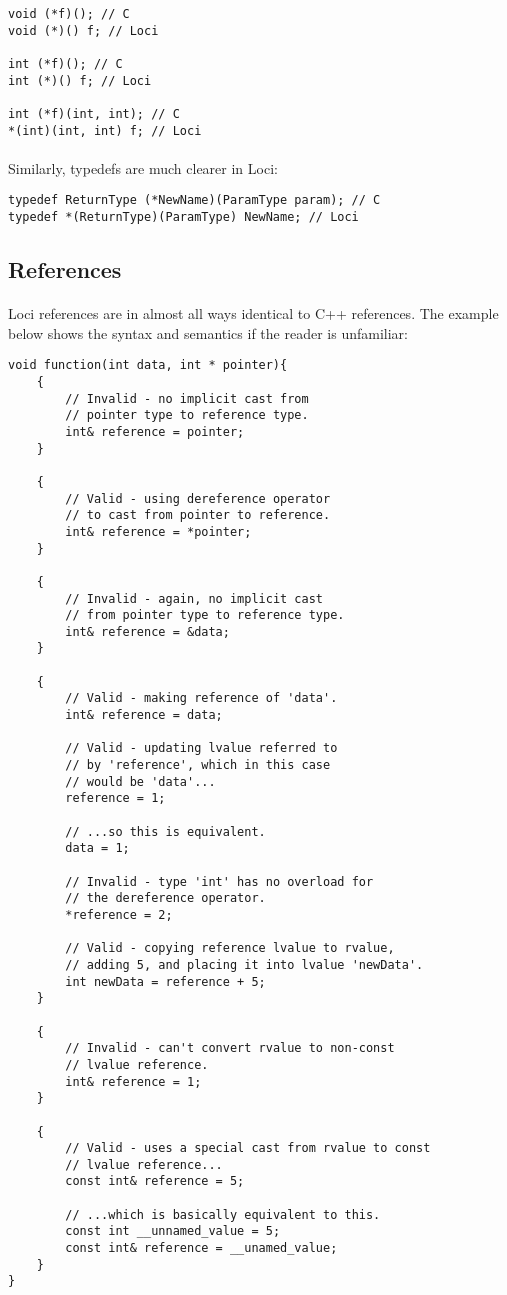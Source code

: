 \documentclass[12pt,twoside,notitlepage]{report}
\begin{document}
\begin{lstlisting}
void (*f)(); // C
void (*)() f; // Loci

int (*f)(); // C
int (*)() f; // Loci

int (*f)(int, int); // C
*(int)(int, int) f; // Loci
\end{lstlisting}


\paragraph{}
Similarly, typedefs are much clearer in Loci:

\begin{lstlisting}
typedef ReturnType (*NewName)(ParamType param); // C
typedef *(ReturnType)(ParamType) NewName; // Loci
\end{lstlisting}


\clearpage

\subsection{References}

\paragraph{}
Loci references are in almost all ways identical to C++ references. The example below shows the syntax and semantics if the reader is unfamiliar:

\begin{lstlisting}
void function(int data, int * pointer){
	{
		// Invalid - no implicit cast from
		// pointer type to reference type.
		int& reference = pointer;
	}
	
	{
		// Valid - using dereference operator
		// to cast from pointer to reference.
		int& reference = *pointer;
	}
	
	{
		// Invalid - again, no implicit cast
		// from pointer type to reference type.
		int& reference = &data;
	}
	
	{
		// Valid - making reference of 'data'.
		int& reference = data;
	
		// Valid - updating lvalue referred to
		// by 'reference', which in this case
		// would be 'data'...
		reference = 1;
		
		// ...so this is equivalent.
		data = 1;
		
		// Invalid - type 'int' has no overload for
		// the dereference operator.
		*reference = 2;
		
		// Valid - copying reference lvalue to rvalue,
		// adding 5, and placing it into lvalue 'newData'.
		int newData = reference + 5;
	}
	
	{
		// Invalid - can't convert rvalue to non-const
		// lvalue reference.
		int& reference = 1;
	}
	
	{	
		// Valid - uses a special cast from rvalue to const
		// lvalue reference...
		const int& reference = 5;
		
		// ...which is basically equivalent to this.
		const int __unnamed_value = 5;
		const int& reference = __unamed_value;
	}
}
\end{lstlisting}
\end{document}
